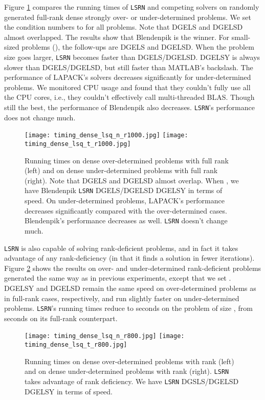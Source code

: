 \documentclass{siamltex}
\begin{document}
Figure \ref{fig:timing_dense_full_rank} compares the running times of
\texttt{LSRN} and competing solvers on randomly generated full-rank dense
strongly over- or under-determined problems. We set the condition numbers to
 for all problems. Note that DGELS and DGELSD almost overlapped. The
results show that Blendenpik is the winner. For small-sized problems (), the follow-ups are DGELS and DGELSD. When the problem size goes larger,
\texttt{LSRN} becomes faster than DGELS/DGELSD. DGELSY is always slower than
DGELS/DGELSD, but still faster than MATLAB's backslash. The performance of
LAPACK's solvers decreases significantly for under-determined problems. We
monitored CPU usage and found that they couldn't fully use all the CPU cores,
i.e., they couldn't effectively call multi-threaded BLAS. Though still the best,
the performance of Blendenpik also decreases. \texttt{LSRN}'s performance does
not change much.

\begin{figure}
  \centering
  \texttt{[image: timing\_dense\_lsq\_n\_r1000.jpg]}
  \texttt{[image: timing\_dense\_lsq\_t\_r1000.jpg]}
  \caption{Running times on  dense over-determined problems with
    full rank (left) and on  dense under-determined problems with
    full rank (right).  Note that DGELS and DGELSD almost overlap. When , we have Blendenpik  \texttt{LSRN}  DGELS/DGELSD  DGELSY 
     in terms of speed. On under-determined problems, LAPACK's
    performance decreases significantly compared with the over-determined
    cases. Blendenpik's performance decreases as well. \texttt{LSRN} doesn't
    change much.}
  \label{fig:timing_dense_full_rank}
\end{figure}

\texttt{LSRN} is also capable of solving rank-deficient problems, and in fact it
takes advantage of any rank-deficiency (in that it finds a solution in fewer
iterations).  Figure \ref{fig:timing_dense_rank_800} shows the results on over-
and under-determined rank-deficient problems generated the same way as in
previous experiments, except that we set . DGELSY and DGELSD remain the
same speed on over-determined problems as in full-rank cases, respectively, and
run slightly faster on under-determined problems. \texttt{LSRN}'s running times
reduce to  seconds on the problem of size , from 
seconds on its full-rank counterpart.

\begin{figure}
  \centering
  \texttt{[image: timing\_dense\_lsq\_n\_r800.jpg]}
  \texttt{[image: timing\_dense\_lsq\_t\_r800.jpg]}
  \caption{Running times on  dense over-determined problems with
    rank  (left) and on  dense under-determined problems
    with rank  (right). \texttt{LSRN} takes advantage of rank
    deficiency. We have \texttt{LSRN}  DGSLS/DGELSD  DGELSY in terms of
    speed.}
  \label{fig:timing_dense_rank_800}
\end{figure}
\end{document}

